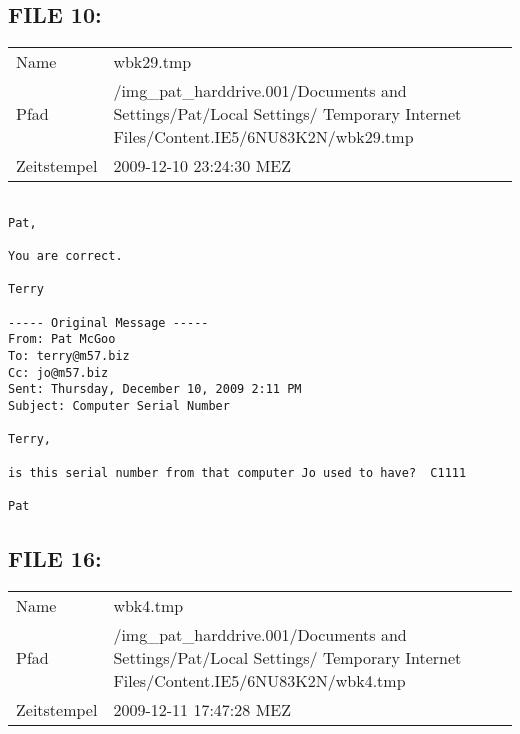 \subsection{FILE 10:}	

\begin{table}[htb]
	\begin{tabular}{p{2cm} p{13.5cm}}
		Name & wbk29.tmp\\
		Pfad & /img_pat_harddrive.001/Documents and Settings/Pat/Local Settings/ Temporary Internet Files/Content.IE5/6NU83K2N/wbk29.tmp\\
		Zeitstempel & 2009-12-10 23:24:30 MEZ
	\end{tabular}
\end{table}	

\begin{lstlisting}

Pat,

You are correct.

Terry

----- Original Message -----
From: Pat McGoo
To: terry@m57.biz
Cc: jo@m57.biz
Sent: Thursday, December 10, 2009 2:11 PM
Subject: Computer Serial Number

Terry,

is this serial number from that computer Jo used to have?  C1111

Pat
\end{lstlisting}

\subsection{FILE 16:}	

\begin{table}[htb]
	\begin{tabular}{p{2cm} p{13.5cm}}
		Name & wbk4.tmp\\
		Pfad & /img_pat_harddrive.001/Documents and Settings/Pat/Local Settings/ Temporary Internet Files/Content.IE5/6NU83K2N/wbk4.tmp\\
		Zeitstempel & 2009-12-11 17:47:28 MEZ
	\end{tabular}
\end{table}	

